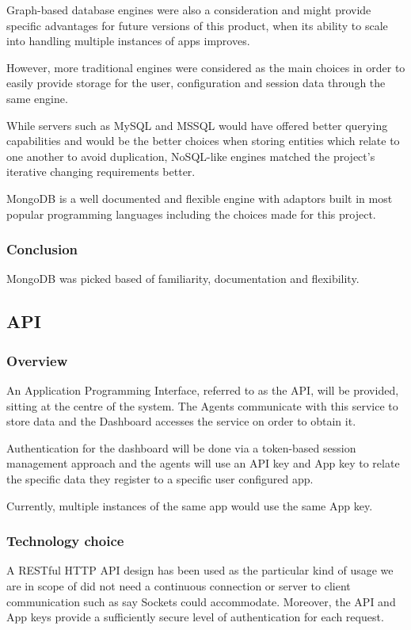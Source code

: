Graph-based database engines were also a consideration and might provide specific advantages for future versions of this product, when its ability to scale into handling multiple instances of apps improves.

However, more traditional engines were considered as the main choices in order to easily provide storage for the user, configuration and session data through the same engine.

While servers such as MySQL and MSSQL would have offered better querying capabilities and would be the better choices when storing entities which relate to one another to avoid duplication, NoSQL-like engines matched the project's iterative changing requirements better.

MongoDB is a well documented and flexible engine with adaptors built in most popular programming languages including the choices made for this project. 

\subsubsection{Conclusion}
MongoDB was picked based of familiarity, documentation and flexibility.

\subsection{API}
\subsubsection{Overview}
An Application Programming Interface, referred to as the API, will be provided, sitting at the centre of the system. The Agents communicate with this service to store data and the Dashboard accesses the service on order to obtain it.

Authentication for the dashboard will be done via a token-based session management approach and the agents will use an API key and App key to relate the specific data they register to a specific user configured app.

Currently, multiple instances of the same app would use the same App key.

\subsubsection{Technology choice}
A RESTful HTTP API design \cite{rest} has been used as the particular kind of usage we are in scope of did not need a continuous connection or server to client communication such as say Sockets could accommodate. Moreover, the API and App keys provide a sufficiently secure level of authentication for each request.

